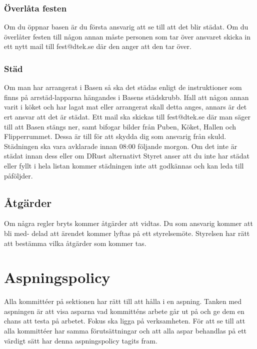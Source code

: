 \documentclass[a4paper]{dtek}
\begin{document}
\subsubsection{Överlåta festen}
Om du öppnar basen är du första ansvarig att se till att det blir städat. Om du överlåter
festen till någon annan måste personen som tar över ansvaret skicka in ett nytt mail till
fest@dtek.se där den anger att den tar över.

\subsubsection{Städ}
Om man har arrangerat i Basen så ska det städas enligt de instruktioner som finns på
arrstäd-lapparna hängandes i Basens städskrubb. Ifall att någon annan varit i köket och
har lagat mat eller arrangerat skall detta anges, annars är det ert ansvar att det är städat.
Ett mail ska skickas till fest@dtek.se där man säger till att Basen stängs ner, samt bifogar
bilder från Puben, Köket, Hallen och Flipperrummet. Dessa är till för att skydda dig som
ansvarig från skuld. Städningen ska vara avklarade innan 08:00 följande morgon. Om det
inte är städat innan dess eller om DRust alternativt Styret anser att du inte har städat
eller fyllt i hela listan kommer städningen inte att godkännas och kan leda till påföljder.

\subsection{Åtgärder}
Om några regler bryts kommer åtgärder att vidtas. Du som ansvarig kommer att bli med-
delad att ärendet kommer lyftas på ett styrelsemöte. Styrelsen har rätt att bestämma vilka
åtgärder som kommer tas.


\section{Aspningspolicy}
Alla kommittéer på sektionen har rätt till att hålla i en aspning. Tanken med aspningen är att visa asparna vad kommitténs arbete går ut på och ge dem en chans att testa på arbetet. Fokus ska ligga på verksamheten. För att se till att alla kommittéer har samma förutsättningar och att alla aspar behandlas på ett värdigt sätt har denna aspningspolicy tagits fram. 
\end{document}

